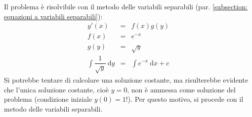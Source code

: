 \documentclass[a4paper]{article}
\begin{document}
	\noindent
	Il problema è risolvibile con il metodo delle variabili separabili (par. \ref{subsection: equazioni a variabili separabili}):
	\begin{equation*}
		\begin{array}{rcl}
			y'\left(x\right) &=& f\left(x\right) g\left(y\right) \\
			f\left(x\right) &=& e^{-x} \\
			g\left(y\right) &=& \sqrt{y} \\ [1em]
			\displaystyle\int \dfrac{1}{\sqrt{y}} \: \mathrm{d}y &=& \displaystyle\int e^{-x} \: \mathrm{d}x + c
		\end{array}
	\end{equation*}
	Si potrebbe tentare di calcolare una soluzione costante, ma risulterebbe evidente che l'unica soluzione costante, cioè $y = 0$, non è ammessa come soluzione del problema (condizione iniziale $y\left(0\right) = 1$!). Per questo motivo, si procede con il metodo delle variabili separabili.\newline
\end{document}
